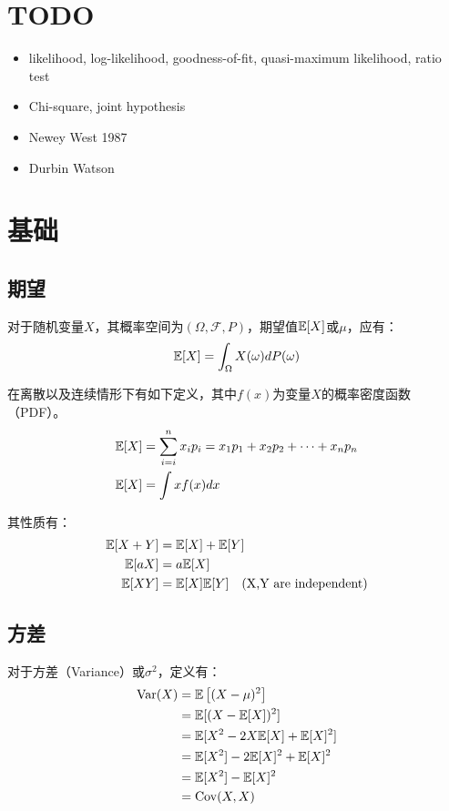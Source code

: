 \documentclass[11pt]{article}
\begin{document}
\maketitle
\tableofcontents

\section{TODO}
\begin{itemize}
    \item likelihood, log-likelihood, goodness-of-fit, quasi-maximum likelihood, ratio test
    \item Chi-square, joint hypothesis
    \item Newey West 1987
    \item Durbin Watson
\end{itemize}

\section{基础}

\subsection{期望}

对于随机变量$X$，其概率空间为$(\Omega,\mathcal{F},P)$，期望值$\mathbb{E}[X]$或$\mu$，应有：
\begin{equation*}
    \mathbb{E}[X] = \int_{\Omega} X(\omega) dP(\omega)
\end{equation*}

在离散以及连续情形下有如下定义，其中$f(x)$为变量$X$的概率密度函数（PDF）。
\begin{align*}
    \mathbb{E}[X] &= \sum_{i=i}^n x_i p_i =x_1 p_1 + x_2 p_2 + \dots + x_n p_n \\
    \mathbb{E}[X] &= \int x f(x) dx
\end{align*}

其性质有：
\begin{align*}
    \mathbb{E}[X+Y] &= \mathbb{E}[X] + \mathbb{E}[Y] \\
    \mathbb{E}[aX] &= a \mathbb{E}[X] \\
    \mathbb{E}[XY] &= \mathbb{E}[X]\mathbb{E}[Y] \quad \text{(X,Y are independent)}
\end{align*}

\subsection{方差}

对于方差（Variance）或$\sigma^2$，定义有：
\begin{align*}
    \operatorname{Var}(X) &= \mathbb{E}\left[ (X-\mu)^2 \right]\\
    &= \mathbb{E}[(X-\mathbb{E}[X])^2] \\
    &= \mathbb{E}[X^2 - 2X\mathbb{E}[X] + \mathbb{E}[X]^2] \\
    &= \mathbb{E}[X^2] - 2\mathbb{E}[X]^2 + \mathbb{E}[X]^2 \\
    &= \mathbb{E}[X^2] - \mathbb{E}[X]^2 \\
    &= \operatorname{Cov}(X,X)
\end{align*}
\end{document}
